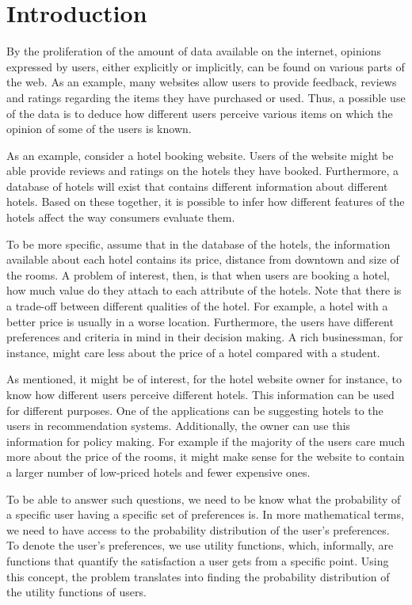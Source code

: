 	\section{Introduction}
	By the proliferation of the amount of data available on the internet, opinions expressed by users, either explicitly or implicitly, can be found on various parts of the web. As an example, many websites allow users to provide feedback, reviews and ratings regarding the items they have purchased or used. Thus, a possible use of the data is to deduce how different users perceive various items on which the opinion of some of the users is known. 
	
	As an example, consider a hotel booking website. Users of the website might be able provide reviews and ratings on the hotels they have booked. Furthermore, a database of hotels will exist that contains different information about different hotels. Based on these together, it is possible to infer how different features of the hotels affect the way consumers evaluate them.
	
	To be more specific, assume that in the database of the hotels, the information available about each hotel contains its price, distance from downtown and size of the rooms. A problem of interest, then, is that when users are booking a hotel, how much value do they attach to each attribute of the hotels. Note that there is a trade-off between different qualities of the hotel. For example, a hotel with a better price is usually in a worse location. Furthermore, the users have different preferences and criteria in mind in their decision making. A rich businessman, for instance, might care less about the price of a hotel compared with a student.
	
	As mentioned, it might be of interest, for the hotel website owner for instance, to know how different users perceive different hotels. This information can be used for different purposes. One of the applications can be suggesting hotels to the users in recommendation systems. Additionally, the owner can use this information for policy making. For example if the majority of the users care much more about the price of the rooms, it might make sense for the website to contain a larger number of low-priced hotels and fewer expensive ones.
	
	To be able to answer such questions, we need to be know what the probability of a specific user having a specific set of preferences is. In more mathematical terms, we need to have access to the probability distribution of the user's preferences. To denote the user's preferences, we use utility functions, which, informally, are functions that quantify the satisfaction a user gets from a specific point. Using this concept, the problem translates into finding the probability distribution of the utility functions of users. 
	
